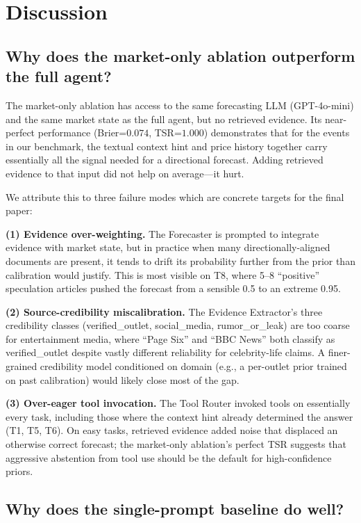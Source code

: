 \documentclass{article} %
\begin{document}
\section{Discussion}
\label{sec:discussion}

\subsection{Why does the market-only ablation outperform the full agent?}

The market-only ablation has access to the same forecasting LLM (GPT-4o-mini) and the same market state as the full agent, but no retrieved evidence. Its near-perfect performance (Brier=$0.074$, TSR=$1.000$) demonstrates that for the events in our benchmark, the textual context hint and price history together carry essentially all the signal needed for a directional forecast. Adding retrieved evidence to that input did not help on average---it hurt.

We attribute this to three failure modes which are concrete targets for the final paper:

\textbf{(1) Evidence over-weighting.} The Forecaster is prompted to integrate evidence with market state, but in practice when many directionally-aligned documents are present, it tends to drift its probability further from the prior than calibration would justify. This is most visible on T8, where 5--8 ``positive'' speculation articles pushed the forecast from a sensible 0.5 to an extreme 0.95.

\textbf{(2) Source-credibility miscalibration.} The Evidence Extractor's three credibility classes (verified\_outlet, social\_media, rumor\_or\_leak) are too coarse for entertainment media, where ``Page Six'' and ``BBC News'' both classify as verified\_outlet despite vastly different reliability for celebrity-life claims. A finer-grained credibility model conditioned on domain (e.g., a per-outlet prior trained on past calibration) would likely close most of the gap.

\textbf{(3) Over-eager tool invocation.} The Tool Router invoked tools on essentially every task, including those where the context hint already determined the answer (T1, T5, T6). On easy tasks, retrieved evidence added noise that displaced an otherwise correct forecast; the market-only ablation's perfect TSR suggests that aggressive abstention from tool use should be the default for high-confidence priors.

\subsection{Why does the single-prompt baseline do well?}
\end{document}
